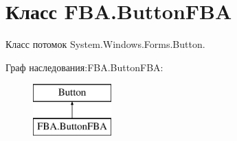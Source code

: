 \hypertarget{class_f_b_a_1_1_button_f_b_a}{}\section{Класс F\+B\+A.\+Button\+F\+BA}
\label{class_f_b_a_1_1_button_f_b_a}


Класс потомок System.\+Windows.\+Forms.\+Button.  


Граф наследования\+:F\+B\+A.\+Button\+F\+BA\+:\begin{figure}[H]
\begin{center}
\leavevmode
\includegraphics[height=2.000000cm]{class_f_b_a_1_1_button_f_b_a}
\end{center}
\end{figure}
